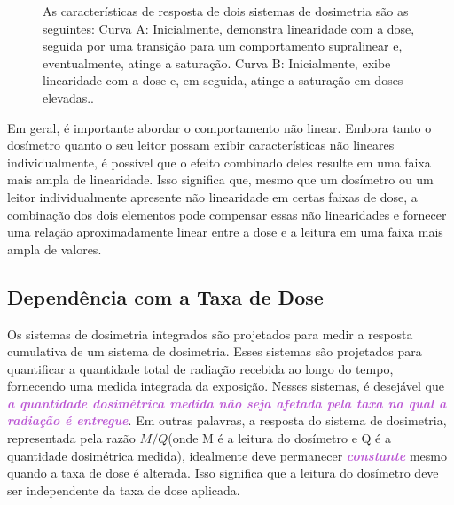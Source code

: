 \documentclass[11pt,a4paper]{article}
\begin{document}
	\begin{figure}[h]
		\centering
		\caption{As características de resposta de dois sistemas de dosimetria são as seguintes: Curva A: Inicialmente, demonstra linearidade com a dose, seguida por uma transição para um comportamento supralinear e, eventualmente, atinge a saturação. Curva B: Inicialmente, exibe linearidade com a dose e, em seguida, atinge a saturação em doses elevadas..}
		\label{fig:linearidade}
	\end{figure}

	Em geral, é importante abordar o comportamento não linear.  Embora tanto o dosímetro quanto o seu leitor possam exibir características não lineares individualmente, é possível que o efeito combinado deles resulte em uma faixa mais ampla de linearidade. Isso significa que, mesmo que um dosímetro ou um leitor individualmente apresente não linearidade em certas faixas de dose, a combinação dos dois elementos pode compensar essas não linearidades e fornecer uma relação aproximadamente linear entre a dose e a leitura em uma faixa mais ampla de valores.

\subsection*{Dependência com a Taxa de Dose}

	Os sistemas de dosimetria integrados são projetados para medir a resposta cumulativa de um sistema de dosimetria. Esses sistemas são projetados para quantificar a quantidade total de radiação recebida ao longo do tempo, fornecendo uma medida integrada da exposição. Nesses sistemas, é desejável que \textcolor{MediumOrchid}{\textit{\textbf{a quantidade dosimétrica medida não seja afetada pela taxa na qual a radiação é entregue}}}. Em outras palavras, a resposta do sistema de dosimetria, representada pela razão $M/Q$(onde M é a leitura do dosímetro e Q é a quantidade dosimétrica medida), idealmente deve permanecer \textcolor{MediumOrchid}{\textit{\textbf{constante}}} mesmo quando a taxa de dose é alterada. Isso significa que a leitura do dosímetro deve ser independente da taxa de dose aplicada.
\end{document}

